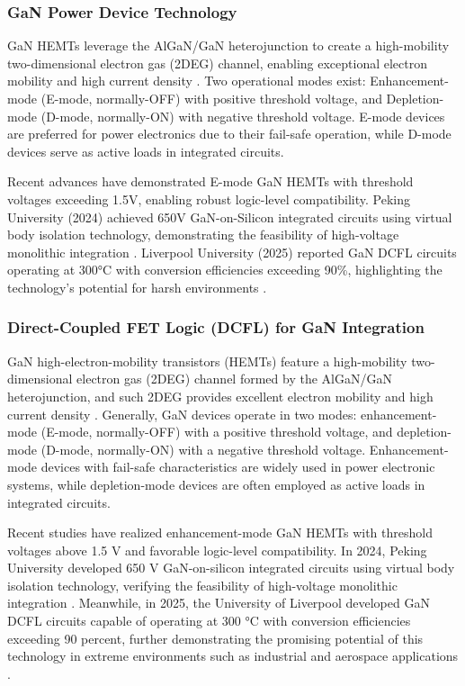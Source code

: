 \documentclass[12pt,a4paper]{article}
\begin{document}
\subsubsection{GaN Power Device Technology}

GaN HEMTs leverage the AlGaN/GaN heterojunction to create a high-mobility two-dimensional electron gas (2DEG) channel, enabling exceptional electron mobility and high current density \cite{ambacher1999two}. Two operational modes exist: Enhancement-mode (E-mode, normally-OFF) with positive threshold voltage, and Depletion-mode (D-mode, normally-ON) with negative threshold voltage. E-mode devices are preferred for power electronics due to their fail-safe operation, while D-mode devices serve as active loads in integrated circuits.

Recent advances have demonstrated E-mode GaN HEMTs with threshold voltages exceeding 1.5V, enabling robust logic-level compatibility. Peking University (2024) achieved 650V GaN-on-Silicon integrated circuits using virtual body isolation technology, demonstrating the feasibility of high-voltage monolithic integration \cite{peking2024virtual}. Liverpool University (2025) reported GaN DCFL circuits operating at 300°C with conversion efficiencies exceeding 90\%, highlighting the technology's potential for harsh environments \cite{liverpool2025high}.

\subsubsection{Direct-Coupled FET Logic (DCFL) for GaN Integration}

GaN high-electron-mobility transistors (HEMTs) feature a high-mobility two-dimensional electron gas (2DEG) channel formed by the AlGaN/GaN heterojunction, and such 2DEG provides excellent electron mobility and high current density \cite{ambacher1999two}. Generally, GaN devices operate in two modes: enhancement-mode (E-mode, normally-OFF) with a positive threshold voltage, and depletion-mode (D-mode, normally-ON) with a negative threshold voltage. Enhancement-mode devices with fail-safe characteristics are widely used in power electronic systems, while depletion-mode devices are often employed as active loads in integrated circuits.

Recent studies have realized enhancement-mode GaN HEMTs with threshold voltages above 1.5 V and favorable logic-level compatibility. In 2024, Peking University developed 650 V GaN-on-silicon integrated circuits using virtual body isolation technology, verifying the feasibility of high-voltage monolithic integration \cite{peking2024virtual}. Meanwhile, in 2025, the University of Liverpool developed GaN DCFL circuits capable of operating at 300 °C with conversion efficiencies exceeding 90 percent, further demonstrating the promising potential of this technology in extreme environments such as industrial and aerospace applications \cite{liverpool2025high}.
\end{document}
